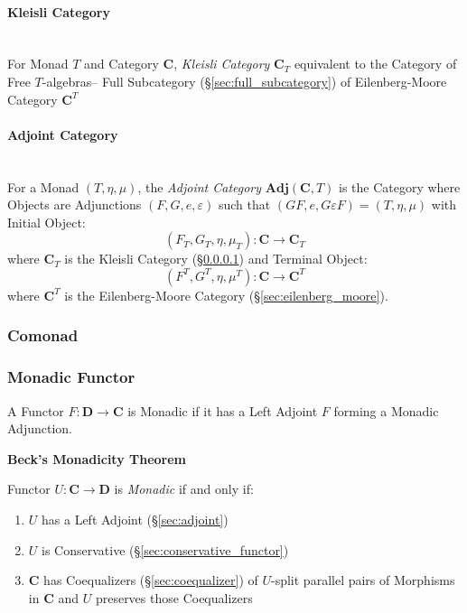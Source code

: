 \paragraph{Kleisli Category}\label{sec:kleisli_category}
\hfill \\

For Monad $T$ and Category $\mathbf{C}$, \emph{Kleisli Category}
$\mathbf{C}_T$ equivalent to the Category of Free $T$-algebras-- Full
Subcategory (\S\ref{sec:full_subcategory}) of Eilenberg-Moore Category
$\mathbf{C}^T$



\paragraph{Adjoint Category}\label{sec:adjoint_category}
\hfill \\

For a Monad $(T,\eta,\mu)$, the \emph{Adjoint Category}
$\mathbf{Adj}(\mathbf{C}, T)$ is the Category where Objects are
Adjunctions $(F,G,e,\varepsilon)$ such that $(GF,e,G \varepsilon F) =
(T,\eta,\mu)$ with Initial Object:
\[
  (F_T, G_T, \eta, \mu_T) : \mathbf{C} \rightarrow \mathbf{C}_T
\]
where $\mathbf{C}_T$ is the Kleisli Category
(\S\ref{sec:kleisli_category}) and Terminal Object:
\[
  (F^T, G^T, \eta, \mu^T) : \mathbf{C} \rightarrow \mathbf{C}^T
\]
where $\mathbf{C}^T$ is the Eilenberg-Moore Category
(\S\ref{sec:eilenberg_moore}).



\subsubsection{Comonad}\label{sec:comonad}

\subsubsection{Monadic Functor}\label{sec:monadic_functor}

A Functor $F : \mathbf{D} \rightarrow \mathbf{C}$ is Monadic if it has
a Left Adjoint $F$ forming a Monadic Adjunction.

\textbf{Beck's Monadicity Theorem}

Functor $U : \mathbf{C} \rightarrow \mathbf{D}$ is \emph{Monadic} if
and only if:
\begin{enumerate}
  \item $U$ has a Left Adjoint (\S\ref{sec:adjoint})
  \item $U$ is Conservative (\S\ref{sec:conservative_functor})
  \item $\mathbf{C}$ has Coequalizers (\S\ref{sec:coequalizer}) of
    $U$-split parallel pairs of Morphisms in $\mathbf{C}$ and $U$
    preserves those Coequalizers
\end{enumerate}


